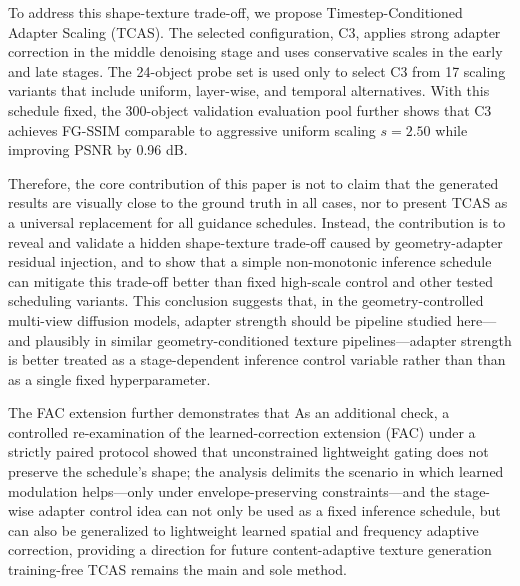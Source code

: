 \documentclass[times,twocolumn,final]{elsarticle}
\providecommand{\DIFadd}[1]{{\protect\color{blue} \sf #1}} %
\providecommand{\DIFdel}[1]{{\protect\color{red} \scriptsize #1}} %
\providecommand{\DIFaddbegin}{} %
\providecommand{\DIFaddend}{} %
\providecommand{\DIFdelbegin}{} %
\providecommand{\DIFdelend}{} %
\newcommand{\DIFscaledelfig}{0.5}
\newlength{\DIFdelgraphicswidth} %
\newlength{\DIFdelgraphicsheight} %
\newcommand{\DIFaddincludegraphics}[2][]{{\color{blue}\fbox{\DIFOincludegraphics[#1]{#2}}}} %
\newcommand{\DIFdelincludegraphics}[2][]{%
\sbox{\DIFdelgraphicsbox}{\DIFOincludegraphics[#1]{#2}}%
\settoboxwidth{\DIFdelgraphicswidth}{\DIFdelgraphicsbox} %
\settoboxtotalheight{\DIFdelgraphicsheight}{\DIFdelgraphicsbox} %
\scalebox{\DIFscaledelfig}{%
\parbox[b]{\DIFdelgraphicswidth}{\usebox{\DIFdelgraphicsbox}\\[-\baselineskip] \rule{\DIFdelgraphicswidth}{0em}}\llap{\resizebox{\DIFdelgraphicswidth}{\DIFdelgraphicsheight}{%
\setlength{\unitlength}{\DIFdelgraphicswidth}%
\begin{picture}(1,1)%
\thicklines\linethickness{2pt} %
{\color[rgb]{1,0,0}\put(0,0){\framebox(1,1){}}}%
{\color[rgb]{1,0,0}\put(0,0){\line( 1,1){1}}}%
{\color[rgb]{1,0,0}\put(0,1){\line(1,-1){1}}}%
\end{picture}%
}\hspace*{3pt}}} %
} %
\DeclareRobustCommand{\DIFaddbegin}{\DIFOaddbegin \let\includegraphics\DIFaddincludegraphics} %
\DeclareRobustCommand{\DIFaddend}{\DIFOaddend \let\includegraphics\DIFOincludegraphics} %
\DeclareRobustCommand{\DIFdelbegin}{\DIFOdelbegin \let\includegraphics\DIFdelincludegraphics} %
\DeclareRobustCommand{\DIFdelend}{\DIFOaddend \let\includegraphics\DIFOincludegraphics} %
\begin{document}
To address this shape-texture trade-off, we propose Timestep-Conditioned Adapter Scaling (TCAS). The selected configuration, C3, applies strong adapter correction in the middle denoising stage and uses conservative scales in the early and late stages. The 24-object probe set is used only to select C3 from 17 scaling variants that include uniform, layer-wise, and temporal alternatives. With this schedule fixed, the 300-object \DIFdelbegin \DIFdel{validation }\DIFdelend \DIFaddbegin \DIFadd{evaluation pool }\DIFaddend further shows that C3 achieves FG-SSIM comparable to aggressive uniform scaling $s = 2.50$ while improving PSNR by 0.96 dB.

Therefore, the core contribution of this paper is not to claim that the generated results are visually close to the ground truth in all cases, nor to present TCAS as a universal replacement for all guidance schedules. Instead, the contribution is to reveal and validate a hidden shape-texture trade-off caused by geometry-adapter residual injection, and to show that a simple non-monotonic inference schedule can mitigate this trade-off better than fixed high-scale control and other tested scheduling variants. This conclusion suggests that, in \DIFaddbegin \DIFadd{the }\DIFaddend geometry-controlled multi-view \DIFdelbegin \DIFdel{diffusion models, adapter strength should be }\DIFdelend \DIFaddbegin \DIFadd{pipeline studied here---and plausibly in similar geometry-conditioned texture pipelines---adapter strength is better }\DIFaddend treated as a stage-dependent inference control variable \DIFdelbegin \DIFdel{rather than }\DIFdelend \DIFaddbegin \DIFadd{than as }\DIFaddend a single fixed hyperparameter.

\DIFdelbegin \DIFdel{The FAC extension further demonstrates that }\DIFdelend \DIFaddbegin \DIFadd{As an additional check, a controlled re-examination of the learned-correction extension (FAC) under a strictly paired protocol showed that unconstrained lightweight gating does not preserve the schedule's shape; the analysis delimits the scenario in which learned modulation helps---only under envelope-preserving constraints---and }\DIFaddend the \DIFdelbegin \DIFdel{stage-wise adapter control idea can not only be used as a fixed inference schedule, but can also be generalized to lightweight learned spatial and frequency adaptive correction, providing a direction for future content-adaptive texture generation}\DIFdelend \DIFaddbegin \DIFadd{training-free TCAS remains the main and sole method}\DIFaddend .
\end{document}
